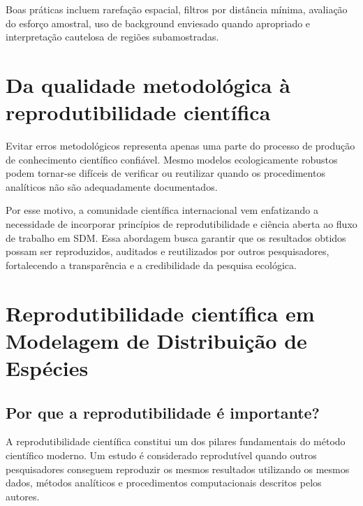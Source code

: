 \begin{center}
\end{center}

Boas práticas incluem rarefação espacial, filtros por distância mínima,
avaliação do esforço amostral, uso de background enviesado quando apropriado e
interpretação cautelosa de regiões subamostradas.

\section{Da qualidade metodológica à reprodutibilidade científica}

Evitar erros metodológicos representa apenas uma parte do processo de produção
de conhecimento científico confiável. Mesmo modelos ecologicamente robustos
podem tornar-se difíceis de verificar ou reutilizar quando os procedimentos
analíticos não são adequadamente documentados.

Por esse motivo, a comunidade científica internacional vem enfatizando a
necessidade de incorporar princípios de reprodutibilidade e ciência aberta ao
fluxo de trabalho em SDM. Essa abordagem busca garantir que os resultados
obtidos possam ser reproduzidos, auditados e reutilizados por outros
pesquisadores, fortalecendo a transparência e a credibilidade da pesquisa
ecológica.

\section{Reprodutibilidade científica em Modelagem de Distribuição de Espécies}

\subsection{Por que a reprodutibilidade é importante?}

A reprodutibilidade científica constitui um dos pilares fundamentais do método
científico moderno. Um estudo é considerado reprodutível quando outros
pesquisadores conseguem reproduzir os mesmos resultados utilizando os mesmos
dados, métodos analíticos e procedimentos computacionais descritos pelos autores.

